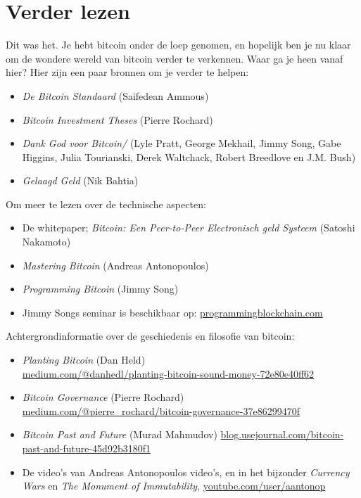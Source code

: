 
\chapter*{Verder lezen}

Dit was het. Je hebt bitcoin onder de loep genomen, en hopelijk ben je nu klaar om de wondere wereld van bitcoin verder te verkennen. Waar ga je heen vanaf hier? Hier zijn een paar bronnen om je verder te helpen:

\begin{itemize}
    \item \textit{De Bitcoin Standaard} (Saifedean Ammous)
    \item \textit{Bitcoin Investment Theses} (Pierre Rochard)
    \item \textit{Dank God voor Bitcoin/} (Lyle Pratt, George Mekhail, Jimmy Song, Gabe Higgins, Julia Tourianski, Derek Waltchack, Robert Breedlove en J.M. Bush)
    \item \textit{Gelaagd Geld} (Nik Bahtia)
\end{itemize}

\noindent Om meer te lezen over de technische aspecten:

\begin{itemize}
    \item De whitepaper; \textit{Bitcoin: Een Peer-to-Peer Electronisch geld Systeem} (Satoshi Nakamoto) 
    \item \textit{Mastering Bitcoin} (Andreas Antonopoulos)
    \item \textit{Programming Bitcoin} (Jimmy Song)
    \item Jimmy Songs seminar is beschikbaar op: \href{https://programmingblockchain.com}{programmingblockchain.com}
\end{itemize}

\clearpage
\noindent Achtergrondinformatie over de geschiedenis en filosofie van bitcoin: 

\begin{itemize}
    \item \textit{Planting Bitcoin} (Dan Held)\\
    \href{https://medium.com/@danhedl/planting-bitcoin-sound-money-72e80e40ff62}{medium.com/@danhedl/planting-bitcoin-sound-money-72e80e40ff62}
    \item \textit{Bitcoin Governance} (Pierre Rochard)\\
    \href{https://medium.com/@pierre\_rochard/bitcoin-governance-37e86299470f}{medium.com/@pierre\_rochard/bitcoin-governance-37e86299470f}
    \item \textit{Bitcoin Past and Future} (Murad Mahmudov) \href{https://blog.usejournal.com/bitcoin-past-and-future-45d92b3180f1}{blog.usejournal.com/bitcoin-past-and-future-45d92b3180f1}
    \item De video's van Andreas Antonopoulos video's, en in het bijzonder \textit{Currency Wars} en \textit{The Monument of Immutability}, \href{https://www.youtube.com/user/aantonop}{youtube.com/user/aantonop}
\end{itemize}

